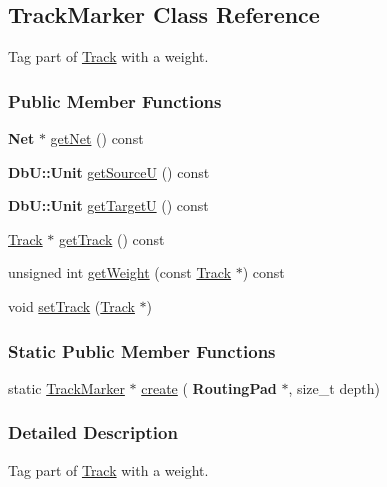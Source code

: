 \hypertarget{classKite_1_1TrackMarker}{}\subsection{Track\+Marker Class Reference}
\label{classKite_1_1TrackMarker}


Tag part of \hyperlink{classKite_1_1Track}{Track} with a weight.  


\subsubsection*{Public Member Functions}
\begin{DoxyCompactItemize}
\item 
\textbf{ Net} $\ast$ \hyperlink{classKite_1_1TrackMarker_a692492374623a5c6096b2c4a51190359}{get\+Net} () const
\item 
\textbf{ Db\+U\+::\+Unit} \hyperlink{classKite_1_1TrackMarker_ad521ffba761b0e81b7b81b99d62f76f9}{get\+SourceU} () const
\item 
\textbf{ Db\+U\+::\+Unit} \hyperlink{classKite_1_1TrackMarker_a4d52a506cd19dfa8e22e1dc0695bd960}{get\+TargetU} () const
\item 
\hyperlink{classKite_1_1Track}{Track} $\ast$ \hyperlink{classKite_1_1TrackMarker_a3f34f9139b8491a0adb531ac3a904171}{get\+Track} () const
\item 
unsigned int \hyperlink{classKite_1_1TrackMarker_a26d951691a2c0f564a4ae842ba200ea5}{get\+Weight} (const \hyperlink{classKite_1_1Track}{Track} $\ast$) const
\item 
void \hyperlink{classKite_1_1TrackMarker_abd3d8093f871d3d1a7f24b053648026c}{set\+Track} (\hyperlink{classKite_1_1Track}{Track} $\ast$)
\end{DoxyCompactItemize}
\subsubsection*{Static Public Member Functions}
\begin{DoxyCompactItemize}
\item 
static \hyperlink{classKite_1_1TrackMarker}{Track\+Marker} $\ast$ \hyperlink{classKite_1_1TrackMarker_ab44a3705a23cba53cf68357de5673c04}{create} (\textbf{ Routing\+Pad} $\ast$, size\+\_\+t depth)
\end{DoxyCompactItemize}


\subsubsection{Detailed Description}
Tag part of \hyperlink{classKite_1_1Track}{Track} with a weight. 

